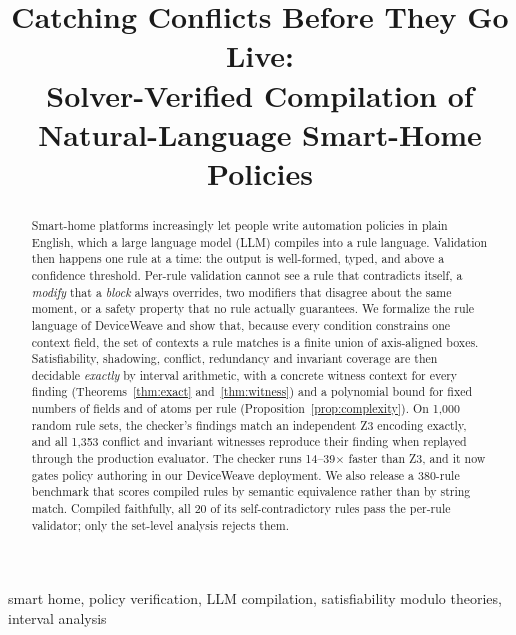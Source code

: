 \documentclass[conference]{IEEEtran}
\theoremstyle{definition}
\begin{document}
\title{Catching Conflicts Before They Go Live:\\ Solver-Verified Compilation of Natural-Language Smart-Home Policies}

\author{
}

\maketitle

\begin{abstract}
Smart-home platforms increasingly let people write automation policies in plain English, which a large language model (LLM) compiles into a rule language. Validation then happens one rule at a time: the output is well-formed, typed, and above a confidence threshold. Per-rule validation cannot see a rule that contradicts itself, a \emph{modify} that a \emph{block} always overrides, two modifiers that disagree about the same moment, or a safety property that no rule actually guarantees. We formalize the rule language of DeviceWeave and show that, because every condition constrains one context field, the set of contexts a rule matches is a finite union of axis-aligned boxes. Satisfiability, shadowing, conflict, redundancy and invariant coverage are then decidable \emph{exactly} by interval arithmetic, with a concrete witness context for every finding (Theorems~\ref{thm:exact} and~\ref{thm:witness}) and a polynomial bound for fixed numbers of fields and of atoms per rule (Proposition~\ref{prop:complexity}). On 1{,}000 random rule sets, the checker's findings match an independent Z3 encoding exactly, and all 1{,}353 conflict and invariant witnesses reproduce their finding when replayed through the production evaluator. The checker runs 14--39$\times$ faster than Z3, and it now gates policy authoring in our DeviceWeave deployment. We also release a 380-rule benchmark that scores compiled rules by semantic equivalence rather than by string match. Compiled faithfully, all 20 of its self-contradictory rules pass the per-rule validator; only the set-level analysis rejects them.
\end{abstract}

\begin{IEEEkeywords}
smart home, policy verification, LLM compilation, satisfiability modulo theories, interval analysis
\end{IEEEkeywords}
\end{document}
